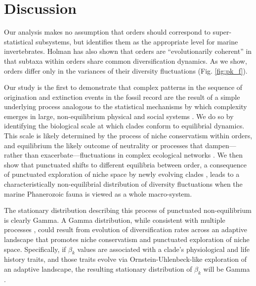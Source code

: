 \documentclass[12pt]{article}
\let\citep=\autocite
\begin{document}
\section*{Discussion}

Our analysis makes no assumption that orders should correspond to
super-statistical subsystems, but identifies them as the appropriate
level for marine invertebrates. Holman \citep{holman1989} has also
shown that orders are ``evolutionarily coherent'' in that subtaxa
within orders share common diversification dynamics. As we show,
orders differ only in the variances of their diversity fluctuations
(Fig. \ref{fig:pk_f}).

Our study is the first to demonstrate that complex patterns in the
sequence of origination and extinction events in the fossil record are
the result of a simple underlying process analogous to the statistical
mechanisms by which complexity emerges in large, non-equilibrium
physical \citep{beck2004} and social systems \citep{fuentes2009}.  We
do so by identifying the biological scale at which clades conform to
equilibrial dynamics. This scale is likely determined by the process
of niche conservatism \citep{roy2009range, hopkins2014} within orders,
and equilibrium the likely outcome of neutrality or processes that
dampen---rather than exacerbate---fluctuations in complex ecological
networks \citep{berlow2009}. We then show that punctuated shifts to
different equilibria between order, a consequence of punctuated
exploration of niche space by newly evolving clades
\citep{eldredgeGould1972, newman1985adaptive, hopkins2014}, leads to a
characteristically non-equilibrial distribution of diversity
fluctuations when the marine Phanerozoic fauna is viewed as a whole
macro-system.

The stationary distribution describing this process of punctuated
non-equilibrium is clearly Gamma.  A Gamma distribution, while
consistent with multiple processes \citep[e.g.][]{cir1985}, could
result from evolution of diversification rates across an adaptive
landscape that promotes niche conservatism and punctuated exploration
of niche space.  Specifically, if $\beta_k$ values are associated with
a clade's physiological and life history traits, and those traits
evolve via Ornstein-Uhlenbeck-like exploration of an adaptive
landscape, the resulting stationary distribution of $\beta_k$ will be
Gamma \citep{cir1985, butler2004}.
\end{document}

